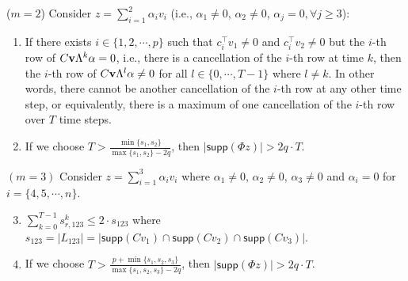 \documentclass[twocolumn]{autart}    %
\newcommand{\rev}[1]{{\normalsize{{{\color{blue}#1}}}}}
\begin{document}
\rev{
\begin{lem}\label{lem:two_vec}
($m=2$)  Consider $z = \sum_{i=1}^2 \alpha_i v_i $ (i.e.,  $\alpha_1 \neq 0$, $\alpha_2 \neq 0$, $\alpha_j = 0, \forall j\ge 3$):
\begin{enumerate}
\item 
If there exists $i \in \{1, 2, \cdots, p\}$ such that $c_i^\top v_1 \neq 0$ and $c_i^\top v_2 \neq 0$ but the $i$-th row of $C {\bf v} \Lambda^k \alpha = 0$, i.e., there is a cancellation of the $i$-th row at time $k$, then the $i$-th row of $C{\bf v} \Lambda^l \alpha \neq 0$ for all $l \in \{ 0, \cdots, T-1 \}$ where $l \neq k$. In other words, there cannot be another cancellation of the $i$-th row at any other time step, or equivalently, there is a maximum of one cancellation of the $i$-th row over $T$ time steps.
\item 
If we choose $T  >  \frac { \min \{s_1, s_2\}} { \max\{s_1, s_2\} - 2q }$, then $\lvert \textsf{supp} (\Phi z) \rvert > 2q\cdot T$. 
\end{enumerate}


$(m=3)$ Consider $z = \sum_{i=1}^3 \alpha_i v_i $ where $\alpha_1 \neq 0$, $\alpha_2 \neq 0$, $\alpha_3 \neq 0$ and $\alpha_i = 0$ for $i = \{4, 5, \cdots , n\}$.   
\begin{enumerate}\setcounter{enumi}{2}
\item 
$\sum_{k=0}^{T-1} s_{r,123}^k \le 2 \cdot s_{123}$ where $s_{123} = \lvert L_{123} \rvert = \lvert \textsf{supp} (Cv_1) \cap \textsf{supp} (Cv_2) \cap \textsf{supp} (Cv_3)  \rvert$.
\item  
If we choose $T > \frac { p + \min \{ s_1, s_2, s_3 \}} { \max \{s_1, s_2, s_3 \} - 2q }$,  then $\lvert \textsf{supp} (\Phi z)\rvert > 2q \cdot T$.
\end{enumerate}
\end{lem}


}
\end{document}
